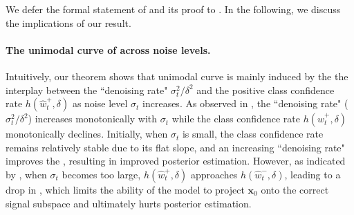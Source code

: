 

We defer the formal statement of  and its proof to . In the following, we discuss the implications of our result.

\paragraph{The unimodal curve of \CSNR\;across noise levels.}
Intuitively, our theorem shows that unimodal curve is mainly induced by the the interplay between the ``denoising rate" $\sigma_t^2/\delta^2$ and the positive class confidence rate $h(\hat{w}_t^+, \delta)$ as noise level $\sigma_t$ increases. As observed in , the ``denoising rate" ($\sigma_t^2/\delta^2$) increases monotonically with $\sigma_t$ while the class confidence rate $h(\hat{w}_t^+, \delta)$ monotonically declines. Initially, when $\sigma_t$ is small, the class confidence rate remains relatively stable due to its flat slope, and an increasing ``denoising rate" improves the \CSNR, resulting in improved posterior estimation. However, as indicated by , when $\sigma_t$ becomes too large, $h(\hat{w}_t^+,\delta)$ approaches $h(\hat{w}_t^-,\delta)$, leading to a drop in \CSNR, which limits the ability of the model to project $\bm x_0$ onto the correct signal subspace and ultimately hurts posterior estimation. 



